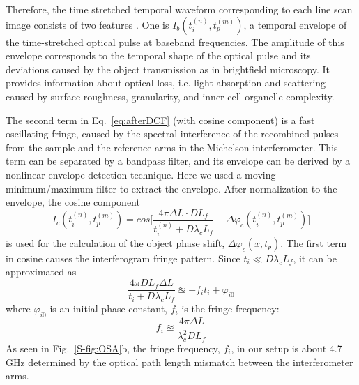 \documentclass[aps,pra,reprint,superscriptaddress]{revtex4-1}
\begin{document}
Therefore, the time stretched temporal waveform corresponding to each line scan image consists of two features \cite{mahjoubfar2014label}. One is $I_b (t_i^{(n)}, t_p^{(m)})$, a temporal envelope of the time-stretched optical pulse at baseband frequencies. The amplitude of this envelope corresponds to the temporal shape of the optical pulse and its deviations caused by the object transmission as in brightfield microscopy. It provides information about optical loss, i.e. light absorption and scattering caused by surface roughness, granularity, and inner cell organelle complexity. 

The second term in Eq.~\ref{eq:afterDCF} (with cosine component) is a fast oscillating fringe, caused by the spectral interference of the recombined pulses from the sample and the reference arms in the Michelson interferometer. This term can be separated by a bandpass filter, and its envelope can be derived by a nonlinear envelope detection technique. Here we used a moving minimum/maximum filter to extract the envelope. After normalization to the envelope, the cosine component 
\begin{equation}
I_c (t_i^{(n)}, t_p^{(m)}) = cos\Bigg[ \frac{4\pi\Delta L \cdot D L_f}{t_i^{(n)} + D\lambda_c L_f} + \Delta \varphi_c(t_i^{(n)}, t_p^{(m)}) \Bigg]
\end{equation}
is used for the calculation of the object phase shift, $\Delta\varphi_c(x,t_p)$. The first term in cosine causes the interferogram fringe pattern. Since $t_i \ll D \lambda_c L_f$, it can be approximated as
\begin{equation}
\frac{4\pi D L_f \Delta L}{t_i + D \lambda_c L_f} \approxeq - f_i t_i + \varphi_{i0}
\end{equation}
where $\varphi_{i0}$ is an initial phase constant, $f_i$ is the fringe frequency:
\begin{equation}
f_i \approxeq \frac{4\pi \Delta L}{\lambda_c^2 D L_f}
\end{equation}
As seen in Fig.~\ref{S-fig:OSA}b, the fringe frequency, $f_i$, in our setup is about 4.7 GHz determined by the optical path length mismatch between the interferometer arms.
\end{document}
